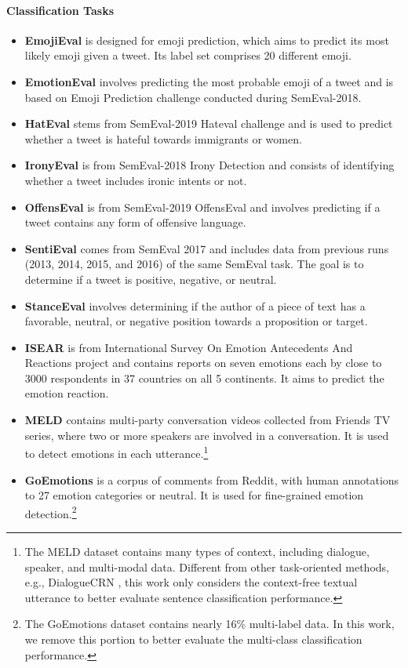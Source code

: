 \documentclass[letterpaper]{article} %
\begin{document}
\paragraph{Classification Tasks}
\begin{itemize}
\item 
\textbf{EmojiEval} \cite{DBLP:conf/semeval/BarbieriCRABBPS18} is designed for emoji prediction, which aims to predict its most likely emoji given a tweet. Its label set comprises 20 different emoji.  
\item 
\textbf{EmotionEval} \cite{DBLP:conf/semeval/MohammadBSK18} involves predicting the most probable emoji of a tweet and is based on Emoji Prediction challenge conducted during SemEval-2018. 
\item \textbf{HatEval} \cite{DBLP:conf/semeval/BasileBFNPPRS19} stems from SemEval-2019 Hateval challenge and is used to predict whether a tweet is hateful towards immigrants or women.
\item
\textbf{IronyEval} \cite{DBLP:conf/semeval/HeeLH18} is from SemEval-2018 Irony Detection and consists of identifying whether a tweet includes ironic intents or not.
    \item 
\textbf{OffensEval} \cite{DBLP:conf/semeval/ZampieriMNRFK19} is from SemEval-2019 OffensEval and involves predicting if a tweet contains any form of offensive language. 
    \item 
\textbf{SentiEval} \cite{DBLP:conf/semeval/RosenthalRNS14} comes from SemEval 2017 and includes data from previous runs (2013,
2014, 2015, and 2016) of the same SemEval task. The goal is to determine if a tweet is positive, negative, or neutral. 
    \item 
\textbf{StanceEval} \cite{DBLP:conf/semeval/MohammadKSZC16} involves determining if the author of a piece of text has a favorable, neutral, or negative position towards a proposition or target. 
    \item 
\textbf{ISEAR} \cite{scherer1994evidence} is from International Survey On Emotion Antecedents And Reactions project and contains reports on seven emotions each by close to 3000 respondents in 37 countries on all 5 continents.
It aims to predict the emotion reaction.
    \item 
\textbf{MELD} \cite{DBLP:conf/acl/PoriaHMNCM19} contains multi-party conversation videos collected from Friends TV series, where two or more speakers are involved in a conversation.  It is used to detect emotions in each utterance.\footnote{The MELD dataset contains many types of context, including dialogue, speaker, and multi-modal data. Different from other task-oriented methods, e.g., DialogueCRN \cite{DBLP:conf/acl/HuWH20}, this work only considers the context-free textual utterance to better evaluate sentence classification performance.}
    \item 
\textbf{GoEmotions} \cite{DBLP:conf/acl/DemszkyMKCNR20} is a corpus of comments from Reddit, with human annotations to 27 emotion categories or neutral. It is used for fine-grained emotion detection.\footnote{The GoEmotions dataset contains nearly 16\% multi-label data. In this work, we remove this portion to better evaluate the multi-class classification performance.}
\end{itemize}
\end{document}
